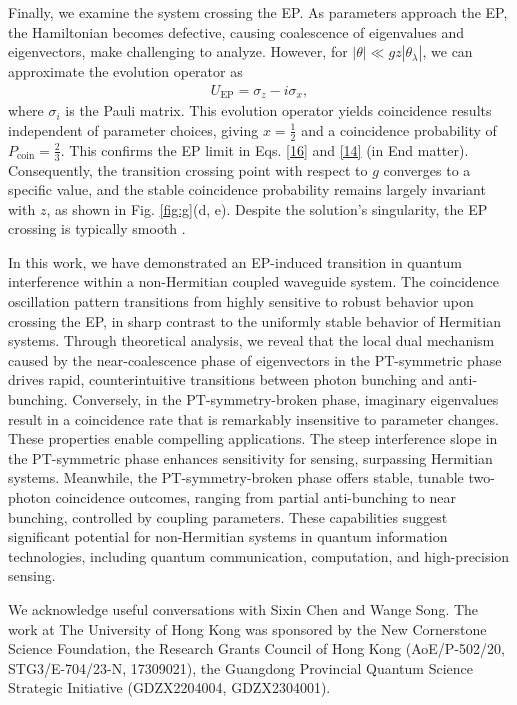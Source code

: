 \documentclass[%
reprint,
superscriptaddress,
amsthm,amsmath,amssymb,
aps,
]{revtex4-1}
\begin{document}
Finally, we examine the system crossing the EP. As parameters approach the EP, the Hamiltonian becomes defective, causing coalescence of eigenvalues and eigenvectors, make challenging to analyze. However, for $|\theta|\ll gz|\theta_{\lambda}|$, we can approximate the evolution operator as
\begin{eqnarray}
	U_{\text{EP}}= \sigma_{z}-i\sigma_{x},
\end{eqnarray}
where $\sigma_{i} $ is the Pauli matrix. This evolution operator yields coincidence results independent of parameter choices, giving $x=\frac{1}{2}$ and a coincidence probability of $P_{\text{coin}}=\frac{2}{3}$. This confirms the EP limit in Eqs. \ref{16} and \ref{14} (in End matter). Consequently, the transition crossing point with respect to $g$ converges to a specific value, and the stable coincidence probability remains largely invariant with $z$, as shown in Fig. \ref{fig:g}(d, e). Despite the solution's singularity, the EP crossing is typically smooth \cite{longhi2018quantum,klauck2025crossing}.

In this work, we have demonstrated an EP-induced transition in quantum interference within a non-Hermitian coupled waveguide system. The coincidence oscillation pattern transitions from highly sensitive to robust behavior upon crossing the EP, in sharp contrast to the uniformly stable behavior of Hermitian systems. Through theoretical analysis, we reveal that the local dual mechanism caused by the near-coalescence phase of eigenvectors in the PT-symmetric phase drives rapid, counterintuitive transitions between photon bunching and anti-bunching. Conversely, in the PT-symmetry-broken phase, imaginary eigenvalues result in a coincidence rate that is remarkably insensitive to parameter changes. These properties enable compelling applications. The steep interference slope in the PT-symmetric phase enhances sensitivity for sensing, surpassing Hermitian systems. Meanwhile, the PT-symmetry-broken phase offers stable, tunable two-photon coincidence outcomes, ranging from partial anti-bunching to near bunching, controlled by coupling parameters. These capabilities suggest significant potential for non-Hermitian systems in quantum information technologies, including quantum communication, computation, and high-precision sensing.

	\begin{acknowledgments}
		We acknowledge useful conversations with Sixin Chen and Wange Song. The work at The University of Hong Kong was sponsored by the New Cornerstone Science Foundation, the Research Grants Council of Hong Kong (AoE/P-502/20, STG3/E-704/23-N, 17309021), the Guangdong Provincial Quantum Science Strategic Initiative (GDZX2204004, GDZX2304001). 		
	\end{acknowledgments}
\end{document}
